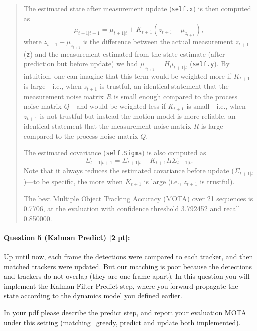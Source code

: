 \documentclass[11pt]{article}
\begin{document}
\begin{quote}
The estimated state after measurement update (\texttt{self.x}) is then computed as 
\[ \mu_{t+1 | t+1} = \mu_{t+1 | t} + K_{t+1} (z_{t+1} - \mu_{z_{t+1}}), \]
where $ z_{t+1} - \mu_{z_{t+1}} $ is the difference between the actual measurement $ z_{t+1} $ (\texttt{z}) and the measurement estimated from the state estimate (after prediction but before update) we had $ \mu_{z_{t+1}} = H \mu_{t+1 | t} $ (\texttt{self.y}). By intuition, one can imagine that this term would be weighted more if $ K_{t+1} $ is large---i.e., when $ z_{t+1} $ is trustful, an identical statement that the measurement noise matrix $ R $ is small enough compared to the process noise matrix $ Q $---and would be weighted less if $ K_{t+1} $ is small---i.e., when $ z_{t+1} $ is not trustful but instead the motion model is more reliable, an identical statement that the measurement noise matrix $ R $ is large compared to the process noise matrix $ Q $. 

The estimated covariance (\texttt{self.Sigma}) is also computed as 
\[ \Sigma_{t+1 | t+1} =  \Sigma_{t+1 | t} - K_{t+1} H \Sigma_{t+1 | t}. \]
Note that it always reduces the estimated covariance before update ($ \Sigma_{t+1 | t} $)---to be specific, the more when $ K_{t+1} $ is large (i.e., $ z_{t+1} $ is trustful).

The best Multiple Object Tracking Accuracy (MOTA) over 21 sequences is 0.7706, at the evaluation with confidence threshold 3.792452 and recall 0.850000. 

\end{quote}


\paragraph{Question 5 (Kalman Predict) [2 pt]:}
Up until now, each frame the detections were compared to each tracker, and then matched trackers were updated. But our matching is poor because the detections and trackers do not overlap (they are one frame apart). In this question you will implement the Kalman Filter Predict step, where you forward propagate the state according to the dynamics model you defined earlier.

In your pdf please describe the predict step, and report your evaluation MOTA under this setting (matching=greedy, predict and update both implemented).
\end{document}
